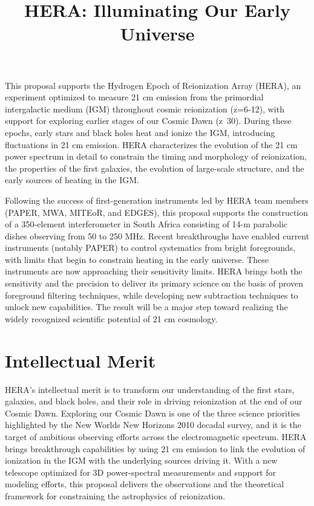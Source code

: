\documentclass[preprint]{aastex}
\begin{document}
\pagestyle{empty}

\title{HERA: Illuminating Our Early Universe}

This proposal supports the Hydrogen Epoch of Reionization Array (HERA), an experiment optimized to measure 21 cm emission from the primordial intergalactic medium (IGM) throughout cosmic reionization (z=6-12), with support for exploring earlier stages of our Cosmic Dawn (z~30).  During these epochs, early stars and black holes heat and ionize the IGM, introducing fluctuations in 21 cm emission.  HERA characterizes the evolution of the 21 cm power spectrum in detail to constrain the timing and morphology of reionization, the properties of the first galaxies, the evolution of large-scale structure, and the early sources of heating in the IGM.

Following the success of first-generation instruments led by HERA team members (PAPER, MWA, MITEoR, and EDGES), this proposal supports the construction of a 350-element interferometer in South Africa consisting of 14-m parabolic dishes observing from 50 to 250 MHz.  Recent breakthroughs have enabled current instruments (notably PAPER) to control systematics from bright foregrounds, with limits that begin to constrain heating in the early universe.  These instruments are now approaching their sensitivity limits.  HERA brings both the sensitivity and the precision to deliver its primary science on the basis of proven foreground filtering techniques, while developing new subtraction techniques to unlock new capabilities.  The result will be a major step toward realizing the widely recognized scientific potential of 21 cm cosmology.

\section*{Intellectual Merit}

HERA's intellectual merit is to transform our understanding of the first stars, galaxies, and black holes, and their role in driving reionization at the end of our Cosmic Dawn.  Exploring our Cosmic Dawn is one of the three science priorities highlighted by the New Worlds New Horizons 2010 decadal survey, and it is the target of ambitious observing efforts across the electromagnetic spectrum.  HERA brings breakthrough capabilities by using 21 cm emission to link the evolution of ionization in the IGM with the underlying sources driving it. With a new telescope optimized for 3D power-spectral measurements and support for modeling efforts, this proposal delivers the observations and the theoretical framework for constraining the astrophysics of reionization.
\end{document}
